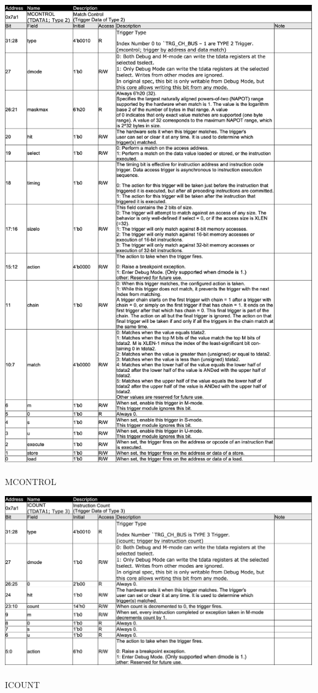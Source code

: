 \begin{table}[H]
    \includegraphics[width=1.00\columnwidth]{./Table/MCONTROL.png}
    \caption{MCONTROL}
    \label{tb:MCONTROL}
\end{table}

\begin{table}[H]
    \includegraphics[width=1.00\columnwidth]{./Table/ICOUNT.png}
    \caption{ICOUNT}
    \label{tb:ICOUNT}
\end{table}

